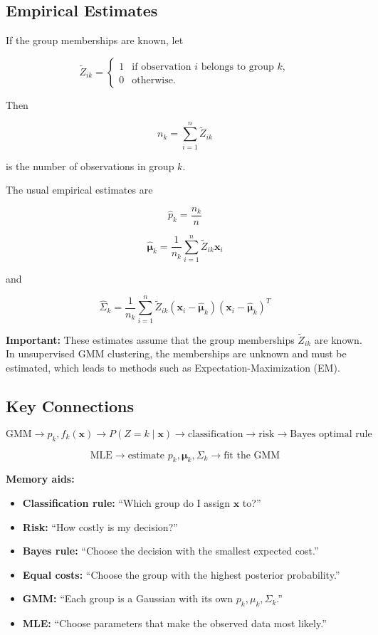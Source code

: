 \documentclass[a4paper,11pt]{article}
\begin{document}
\subsection{Empirical Estimates}

If the group memberships are known, let

$$
\tilde Z_{ik}=
\begin{cases}
1 & \text{if observation }i\text{ belongs to group }k,\\
0 & \text{otherwise.}
\end{cases}
$$

Then

$$
n_k=\sum_{i=1}^n\tilde Z_{ik}
$$

is the number of observations in group $k$.

The usual empirical estimates are

$$
\boxed{
\hat p_k=\frac{n_k}{n}
}
$$

$$
\boxed{
\hat{\boldsymbol{\mu}}_k
=
\frac{1}{n_k}
\sum_{i=1}^n
\tilde Z_{ik}\mathbf{x}_i
}
$$

and

$$
\boxed{
\hat\Sigma_k
=
\frac{1}{n_k}
\sum_{i=1}^n
\tilde Z_{ik}
(\mathbf{x}_i-\hat{\boldsymbol{\mu}}_k)
(\mathbf{x}_i-\hat{\boldsymbol{\mu}}_k)^T
}
$$

\textbf{Important:} These estimates assume that the group memberships
$\tilde Z_{ik}$ are known. In unsupervised GMM clustering, the memberships
are unknown and must be estimated, which leads to methods such as
Expectation-Maximization (EM).

\subsection{Key Connections}

$$
\boxed{
\text{GMM}
\rightarrow
p_k,f_k(\mathbf{x})
\rightarrow
P(Z=k\mid\mathbf{x})
\rightarrow
\text{classification}
\rightarrow
\text{risk}
\rightarrow
\text{Bayes optimal rule}
}
$$

$$
\boxed{
\text{MLE}
\rightarrow
\text{estimate }p_k,\boldsymbol{\mu}_k,\Sigma_k
\rightarrow
\text{fit the GMM}
}
$$

\textbf{Memory aids:}
\begin{itemize}
\item \textbf{Classification rule:} ``Which group do I assign $\mathbf{x}$ to?''
    \item \textbf{Risk:} ``How costly is my decision?''
\item \textbf{Bayes rule:} ``Choose the decision with the smallest expected cost.''
    \item \textbf{Equal costs:} ``Choose the group with the highest posterior probability.''
\item \textbf{GMM:} ``Each group is a Gaussian with its own $p_k,\mu_k,\Sigma_k$.''
    \item \textbf{MLE:} ``Choose parameters that make the observed data most likely.''
\end{itemize}
\end{document}
